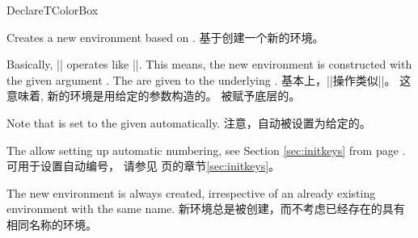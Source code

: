 \begin{docCommand}{DeclareTColorBox}{}
\begin{stripedbox}
Creates a new environment  based on .
\tcblower
基于创建一个新的环境。
\end{stripedbox}

\begin{stripedbox}
Basically, |\DeclareTColorBox| operates like |\DeclareDocumentEnvironment|. This means,
the new environment  is constructed with the given argument .
The  are given to the underlying .
\tcblower
基本上，|\DeclareTColorBox|操作类似|\DeclareDocumentEnvironment|。%
这意味着,%
新的环境是用给定的参数构造的。%
被赋予底层的。
\end{stripedbox}

\begin{stripedbox}
Note that  is set to the given 
automatically.
\tcblower
注意，自动被设置为给定的。
\end{stripedbox}

\begin{stripedbox}
The  allow setting up automatic numbering,
see Section \ref{sec:initkeys} from page \pageref{sec:initkeys}.
\tcblower
{}可用于设置自动编号，%
请参见 \pageref{sec:initkeys}页的章节\ref{sec:initkeys}。
\end{stripedbox}

\begin{stripedbox}
The new environment is always created, irrespective of an already existing
environment with the same name.
\tcblower
新环境总是被创建，而不考虑已经存在的具有相同名称的环境。
\end{stripedbox}

\end{docCommand}
